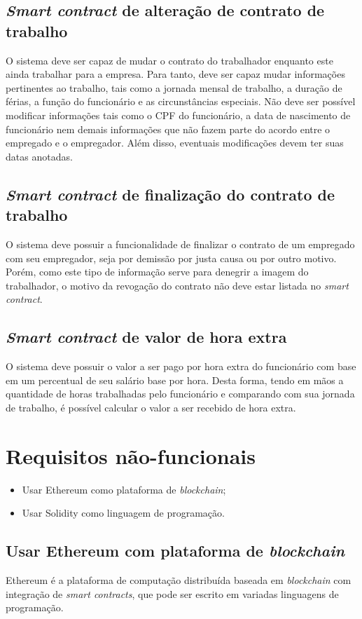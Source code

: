 \documentclass{article}
\begin{document}
\subsection{\textit{Smart contract} de alteração de contrato de trabalho}
O sistema deve ser capaz de mudar o contrato do trabalhador enquanto este
ainda trabalhar para a empresa. Para tanto, deve ser capaz mudar informações
pertinentes ao trabalho, tais como a jornada mensal de trabalho, a duração de férias,
a função do funcionário e as circunstâncias especiais. Não deve ser possível modificar
informações tais como o CPF do funcionário, a data de nascimento de funcionário
nem demais informações que não fazem parte do acordo entre o empregado e o
empregador. Além disso, eventuais modificações devem ter suas datas anotadas.

\subsection{\textit{Smart contract} de finalização do contrato de trabalho}
O sistema deve possuir a funcionalidade de finalizar o contrato de um empregado
com seu empregador, seja por demissão por justa causa ou por outro motivo.
Porém, como este tipo de informação serve para denegrir a imagem do trabalhador,
o motivo da revogação do contrato não deve estar listada no \textit{smart contract}.

\subsection{\textit{Smart contract} de valor de hora extra}
O sistema deve possuir o valor a ser pago por hora extra do funcionário com base em
um percentual de seu salário base por hora. Desta forma, tendo em mãos a quantidade de horas
trabalhadas pelo funcionário e comparando com sua jornada de trabalho, é possível calcular
o valor a ser recebido de hora extra.


\section{Requisitos não-funcionais}
\begin{itemize}
    \item Usar Ethereum como plataforma de \textit{blockchain};
    \item Usar Solidity como linguagem de programação.
\end{itemize}

\subsection{Usar Ethereum com plataforma de \textit{blockchain}}
Ethereum é a plataforma de computação distribuída baseada em \textit{blockchain} com integração de \textit{smart contracts}, que pode ser escrito em variadas
linguagens de programação.
\end{document}
